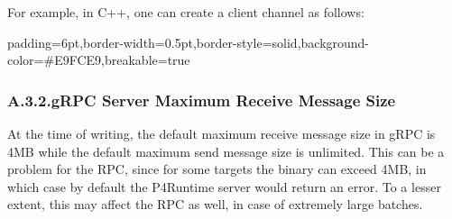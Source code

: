\documentclass[11pt]{article}
\begin{document}
{%
For example, in C++, one can create a client channel as follows:%

\begin{mdbmargintb}{6pt}{6pt}%
\begin{mdblock}{padding=6pt,border-width=0.5pt,border-style=solid,background-color=\#E9FCE9,breakable=true}%
\begin{mdpre}%
\end{mdpre}%
\end{mdblock}%
\end{mdbmargintb}%

\subsubsection{A.3.2.\hspace*{0.5em}gRPC Server Maximum Receive Message Size}\label{sec-grpc-server-maximum-receive-message-size}%

\noindent{}At the time of writing, the default maximum receive message size in gRPC is 4MB
\textemdash{} while the default maximum send message size is unlimited. This can be a
problem for the  RPC, since for some targets the
binary  can exceed 4MB, in which case by default the P4Runtime
server would return an  error. To a lesser extent, this may
affect the  RPC as well, in case of extremely large batches.%

}
\end{document}
